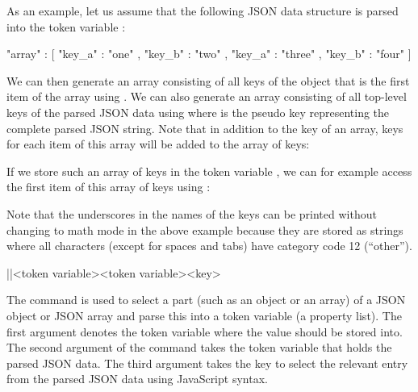 \documentclass[a4paper]{article}
\begin{document}
{{As an example, let us assume that the following JSON data structure is parsed into the token variable \macro{\myJSONdata}:

\begin{codeexample}
{
  "array" : [
    {
      "key_a" : "one" ,
      "key_b" : "two"
    } ,
    {
      "key_a" : "three" ,
      "key_b" : "four"
    }
  ]
}
\end{codeexample}

We can then generate an array consisting of all keys of the object that is the first item of the array using . We can also generate an array consisting of all top-level keys of the parsed JSON data using  where  is the pseudo key representing the complete parsed JSON string. Note that in addition to the key of an array, keys for each item of this array will be added to the array of keys:

\begin{codeexamplecolumns}

\end{codeexamplecolumns}

If we store such an array of keys in the token variable \macro{\myJSONkeys}, we can for example access the first item of this array of keys using \macro{\JSONParseValue{\myJSONkeys}{[0]}}:

\begin{codeexamplecolumns}
\JSONParseValue{\myJSONkeys}{[0]}
\end{codeexamplecolumns}

Note that the underscores in the names of the keys can be printed without changing to math mode in the above example because they are stored as strings where all characters (except for spaces and tabs) have category code 12 (``other'').

\begin{macrodef}
|\JSONParseFilter|{<token variable>}{<token variable>}{<key>}
\end{macrodef}
The command \macro{\JSONParseFilter} is used to select a part (such as an object or an array) of a JSON object or JSON array and parse this into a token variable (a property list). The first argument denotes the token variable where the value should be stored into. The second argument of the command takes the token variable that holds the parsed JSON data. The third argument takes the key to select the relevant entry from the parsed JSON data using JavaScript syntax.

}}
\end{document}
